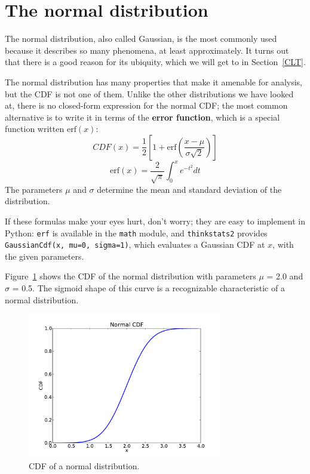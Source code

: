 \documentclass[12pt]{book}
\begin{document}
\section{The normal distribution}
\label{normal}

\newcommand{\erf}{\mathrm{erf}}

The normal distribution, also called Gaussian, is the most commonly
used because it describes so many phenomena, at least approximately.
It turns out that there is a good reason for its ubiquity, which we
will get to in Section~\ref{CLT}.

The normal distribution has many properties that make it amenable for
analysis, but the CDF is not one of them.  Unlike the
other distributions we have looked at, there is no closed-form
expression for the normal CDF; the most common alternative is to write
it in terms of the {\bf error function}, which is a special function
written $\erf(x)$:
%
\[ CDF(x) = \frac{1}{2} \left[ 1 +
  \erf \left( \frac{x - \mu}{\sigma \sqrt{2}} \right) \right] \]
%
\[ \erf(x) = \frac{2}{\sqrt{\pi}} \int_{0}^x e^{-t^2} dt \]
%
The parameters $\mu$ and $\sigma$ determine the mean and standard
deviation of the distribution.

If these formulas make your eyes hurt, don't worry; they are easy to
implement in Python: {\tt erf} is available in the {\tt math} module,
and {\tt thinkstats2} provides {\tt GaussianCdf(x, mu=0, sigma=1)},
which evaluates a Gaussian CDF at $x$, with the given parameters.

Figure~\ref{normal_cdf} shows the CDF of the normal distribution
with parameters $\mu$ = 2.0 and $\sigma$ = 0.5.  The sigmoid shape of
this curve is a recognizable characteristic of a normal distribution.

\begin{figure}
\centerline{\includegraphics[height=2.5in]{figs/normal_cdf.pdf}}
\caption{CDF of a normal distribution.}
\label{normal_cdf}
\end{figure}
\end{document}
